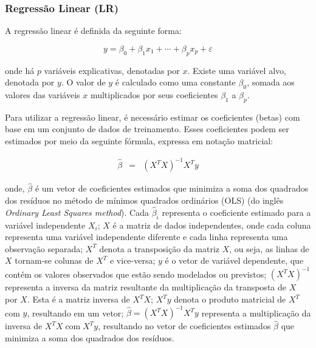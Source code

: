 




\subsubsection{Regress\~ao Linear (LR)}

A regressão linear é definida da seguinte forma:

\begin{equation}
	y = \beta_0 + \beta_1 x_1 + \cdots + \beta_p x_p + \varepsilon \label{eq:lr}
\end{equation}

\noindent onde há $p$ variáveis explicativas, denotadas por $x$. Existe uma variável alvo, denotada por $y$. O valor de $y$ é calculado como uma constante $\beta_0$, somada aos valores das variáveis $x$ multiplicados por seus coeficientes $\beta_1$ a $\beta_p$.


Para utilizar a regressão linear, é necessário estimar os coeficientes (betas) com base em um conjunto de dados de treinamento. Esses coeficientes podem ser estimados por meio da seguinte fórmula, expressa em notação matricial:

\begin{eqnarray}
	\hat{\beta}&=&\left(X^T X\right)^{-1} X^T y\label{eq:ols}
\end{eqnarray}

\noindent onde, $\hat{\beta}$ é um vetor de coeficientes estimados que minimiza a soma dos quadrados dos resíduos no método de mínimos quadrados ordinários (OLS) (do inglês \textit{Ordinary Least Squares method}). Cada $\hat{\beta}_i$ representa o coeficiente estimado para a variável independente $X_i$;
$X$ é a matriz de dados independentes, onde cada coluna representa uma variável independente diferente e cada linha representa uma observação separada;
$X^T$ denota a transposição da matriz $X$, ou seja, as linhas de $X$ tornam-se colunas de $X^T$ e vice-versa;
$y$ é o vetor de variável dependente, que contém os valores observados que estão sendo modelados ou previstos;
$\left(X^T X\right)^{-1}$ representa a inversa da matriz resultante da multiplicação da transposta de $X$ por $X$. Esta é a matriz inversa de $X^T X$;
$X^T y$ denota o produto matricial de $X^T$ com $y$, resultando em um vetor;
$\hat{\beta}=\left(X^T X\right)^{-1} X^T y$ representa a multiplicação da inversa de $X^T X \operatorname{com} X^T y$, resultando no vetor de coeficientes estimados $\hat{\beta}$ que minimiza a soma dos quadrados dos resíduos.

